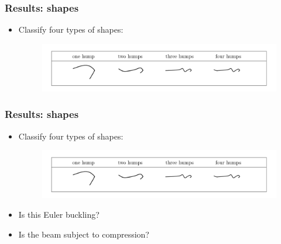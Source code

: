 \documentclass{beamer}
\begin{document}
\begin{frame}
	\frametitle{Results: shapes}
	\begin{overlayarea}{\textwidth}{\textheight}
\begin{itemize}
	\item Classify four types of shapes: \vspace{-0.3cm}
	\begin{figure}[htb]
		\begin{center}
			\includegraphics[width=1\textwidth]{plots/deformations.png}
		\end{center}
	\end{figure}
\end{itemize}
	\end{overlayarea}
\end{frame}






\begin{frame}
	\frametitle{Results: shapes}
	\begin{overlayarea}{\textwidth}{\textheight}
		\begin{itemize}
			\item Classify four types of shapes: \vspace{-0.3cm}
			\begin{figure}[htb]
				\begin{center}
					\includegraphics[width=1\textwidth]{plots/deformations.png}
				\end{center}
			\end{figure}
			\item Is this Euler buckling?
			\item Is the beam subject to compression?
		\end{itemize}
	\end{overlayarea}
\end{frame}
\end{document}
